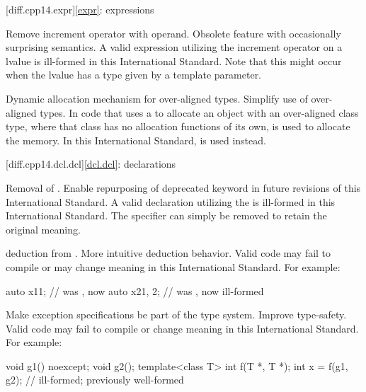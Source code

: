 [diff.cpp14.expr]{\ref{expr}: expressions}

\change
Remove increment operator with  operand.
\rationale
Obsolete feature with occasionally surprising semantics.
\effect
A valid \CppXIV{} expression utilizing the increment operator on
a  lvalue is ill-formed in this International Standard.
Note that this might occur when the lvalue has a type given by a template
parameter.

\change
Dynamic allocation mechanism for over-aligned types.
\rationale
Simplify use of over-aligned types.
\effect
In \CppXIV{} code that uses a 
to allocate an object with an over-aligned class type,
where that class has no allocation functions of its own,
is used to allocate the memory.
In this International Standard,
is used instead.

[diff.cpp14.dcl.dcl]{\ref{dcl.dcl}: declarations}

%
\change
Removal of  .
\rationale
Enable repurposing of deprecated keyword in future revisions of this International Standard.
\effect
A valid \CppXIV{} declaration utilizing the 
 is ill-formed in this International Standard.
The specifier can simply be removed to retain the original meaning.

\change
{} deduction from .
\rationale
More intuitive deduction behavior.
\effect
Valid \CppXIV{} code may fail to compile or may change meaning
in this International Standard. For example:
\begin{codeblock}
auto x1{1};         // was , now 
auto x2{1, 2};      // was , now ill-formed
\end{codeblock}

\change
Make exception specifications be part of the type system.
\rationale
Improve type-safety.
\effect
Valid \CppXIV{} code may fail to compile or change meaning in this
International Standard.
For example:
\begin{codeblock}
void g1() noexcept;
void g2();
template<class T> int f(T *, T *);
int x = f(g1, g2);              // ill-formed; previously well-formed
\end{codeblock}


